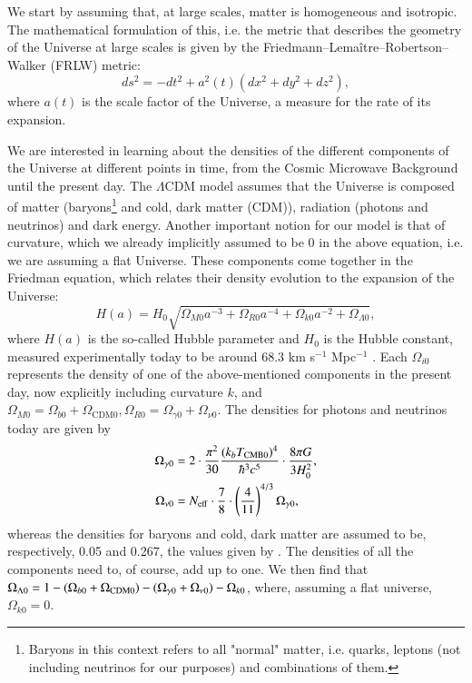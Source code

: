 \documentclass{aa}
\begin{document}
We start by assuming that, at large scales, matter is homogeneous and isotropic. The mathematical formulation of this, i.e. the metric that describes the geometry of the Universe at large scales is given by the Friedmann–Lemaître–Robertson–Walker (FRLW) metric:
\begin{equation}
ds^2 = -dt^2 + a^2(t)(dx^2 + dy^2 + dz^2),
\end{equation}
where $a(t)$ is the scale factor of the Universe, a measure for the rate of its expansion.

We are interested in learning about the densities of the different components of the Universe at different points in time, from the Cosmic Microwave Background until the present day. The $\Lambda$CDM model assumes that the Universe is composed of matter (baryons\footnote{Baryons in this context refers to all "normal" matter, i.e. quarks, leptons (not including neutrinos for our purposes) and combinations of them.} and cold, dark matter (CDM)), radiation (photons and neutrinos) and dark energy. Another important notion for our model is that of curvature, which we already implicitly assumed to be 0 in the above equation, i.e. we are assuming a flat Universe. These components come together in the Friedman equation, which relates their density evolution to the expansion of the Universe:
\begin{equation}
H(a) = H_0 \sqrt{\Omega_{M0}a^{-3} + \Omega_{R0}a^{-4} + \Omega_{k 0} a^{-2} + \Omega_{\Lambda 0}},
\end{equation}
where $H(a)$ is the so-called Hubble parameter and $H_0$ is the Hubble constant, measured experimentally today to be around 68.3 km s$^{-1}$ Mpc$^{-1}$ \citep{Kozmanyan_2019}. Each $\Omega_{i0}$ represents the density of one of the above-mentioned components in the present day, now explicitly including curvature $k$, and $\Omega_{M0} = \Omega_{b0} + \Omega_\text{CDM0}, \Omega_{R0} = \Omega_{\gamma0} + \Omega_{\nu0}$. The densities for photons and neutrinos today are given by
\begin{align}
\Omega_{\gamma 0} &= 2\cdot \frac{\pi^2}{30} \frac{(k_bT_{\rm CMB 0})^4}{\hbar^3 c^5} \cdot \frac{8\pi G}{3H_0^2},\\
\Omega_{\nu 0} &= N_{\rm eff}\cdot \frac{7}{8}\cdot \left(\frac{4}{11}\right)^{4/3}\Omega_{\gamma 0},
\end{align}
whereas the densities for baryons and cold, dark matter are assumed to be, respectively, 0.05 and 0.267, the values given by \cite{2020}. The densities of all the components need to, of course, add up to one. We then find that 
$\Omega_{\Lambda 0} = 1 - (\Omega_{b 0}+\Omega_{\rm CDM 0}) - (\Omega_{\gamma 0} + \Omega_{\nu 0}) - \Omega_{k 0}$, where, assuming a flat universe, $\Omega_{k 0} = 0$.
\end{document}
